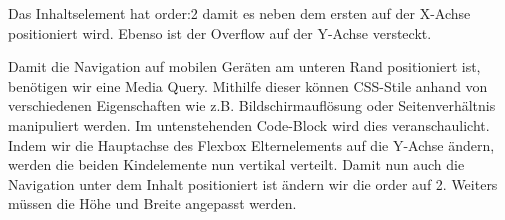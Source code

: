 Das Inhaltselement hat order:2 damit es neben dem ersten auf der X-Achse
positioniert wird. Ebenso ist der Overflow auf der Y-Achse versteckt.

\begin{Shaded}
\begin{Highlighting}[]
\NormalTok{\{}
  \NormalTok{: }\NormalTok{;}
  \NormalTok{: }\NormalTok{;}
  \NormalTok{: }\NormalTok{;}
\NormalTok{\}}
\end{Highlighting}
\end{Shaded}

Damit die Navigation auf mobilen Geräten am unteren Rand positioniert
ist, benötigen wir eine Media Query. Mithilfe dieser können CSS-Stile
anhand von verschiedenen Eigenschaften wie z.B. Bildschirmauflösung oder
Seitenverhältnis manipuliert werden. Im untenstehenden Code-Block wird
dies veranschaulicht. Indem wir die Hauptachse des Flexbox
Elternelements auf die Y-Achse ändern, werden die beiden Kindelemente
nun vertikal verteilt. Damit nun auch die Navigation unter dem Inhalt
positioniert ist ändern wir die order auf 2. Weiters müssen die Höhe und
Breite angepasst werden.

\begin{Shaded}
\begin{Highlighting}[]
\NormalTok{ (}\NormalTok{: }\DecValTok{576px}\NormalTok{)\{}
  \NormalTok{\{}
\NormalTok{  \}}

  \NormalTok{\{}
      \NormalTok{: }
      \NormalTok{: }
      \NormalTok{: }\DecValTok{66px}
\NormalTok{    \}}
\NormalTok{  \}}
\end{Highlighting}
\end{Shaded}

